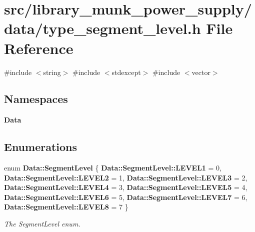 \section{src/library\+\_\+munk\+\_\+power\+\_\+supply/data/type\+\_\+segment\+\_\+level.h File Reference}
\label{type__segment__level_8h}
{\ttfamily \#include $<$string$>$}\newline
{\ttfamily \#include $<$stdexcept$>$}\newline
{\ttfamily \#include $<$vector$>$}\newline
\subsection*{Namespaces}
\begin{DoxyCompactItemize}
\item 
 \textbf{ Data}
\end{DoxyCompactItemize}
\subsection*{Enumerations}
\begin{DoxyCompactItemize}
\item 
enum \textbf{ Data\+::\+Segment\+Level} \{ \newline
\textbf{ Data\+::\+Segment\+Level\+::\+L\+E\+V\+E\+L1} = 0, 
\textbf{ Data\+::\+Segment\+Level\+::\+L\+E\+V\+E\+L2} = 1, 
\textbf{ Data\+::\+Segment\+Level\+::\+L\+E\+V\+E\+L3} = 2, 
\textbf{ Data\+::\+Segment\+Level\+::\+L\+E\+V\+E\+L4} = 3, 
\newline
\textbf{ Data\+::\+Segment\+Level\+::\+L\+E\+V\+E\+L5} = 4, 
\textbf{ Data\+::\+Segment\+Level\+::\+L\+E\+V\+E\+L6} = 5, 
\textbf{ Data\+::\+Segment\+Level\+::\+L\+E\+V\+E\+L7} = 6, 
\textbf{ Data\+::\+Segment\+Level\+::\+L\+E\+V\+E\+L8} = 7
 \}\begin{DoxyCompactList}\small\item\em The Segment\+Level enum. \end{DoxyCompactList}
\end{DoxyCompactItemize}
